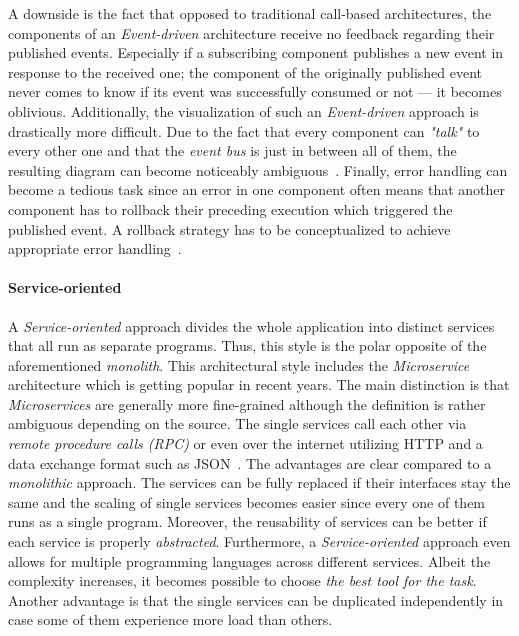 \documentclass[12pt,a4paper,twoside]{report}
\begin{document}
A downside is the fact that opposed to traditional call-based architectures,
the components of an \textit{Event-driven} architecture receive no feedback regarding
their published events. Especially if a subscribing component publishes a new event
in response to the received one; the component of the originally published
event never comes to know if its event was successfully consumed or not ---
it becomes oblivious.
Additionally, the visualization of such an \textit{Event-driven} approach
is drastically more difficult. Due to the fact that every component can
\textit{"talk"} to every other one and that the \textit{event bus} is just in between
all of them, the resulting diagram can become noticeably ambiguous~\cite{fairbanks-sa}.
Finally, error handling can become a tedious task since an error in one component
often means that another component has to rollback their preceding execution which
triggered the published event. A rollback strategy has to be conceptualized to
achieve appropriate error handling~\cite{richards-sa-patterns}.

\paragraph{Service-oriented}
A \textit{Service-oriented} approach divides the whole application into distinct
services that all run as separate programs. Thus, this style is the
polar opposite of the aforementioned \textit{monolith}.
This architectural style includes the \textit{Microservice} architecture
which is getting popular in recent years. The main distinction is that
\textit{Microservices} are generally more fine-grained although the definition
is rather ambiguous depending on the source.
The single services call each other via
\textit{remote procedure calls (RPC)} or even over the internet utilizing HTTP
and a data exchange format such as JSON~\cn.
The advantages are clear compared to a \textit{monolithic} approach.
The services can be fully replaced if their interfaces stay the same and the
scaling of single services becomes easier since every one of them runs as a single program.
Moreover, the reusability of services can be better if each service is properly \textit{abstracted}.
Furthermore, a \textit{Service-oriented} approach even allows for multiple programming languages
across different services. Albeit the complexity increases, it becomes possible
to choose \textit{the best tool for the task}.
Another advantage is that the single services can be duplicated independently
in case some of them experience more load than others.
\end{document}

